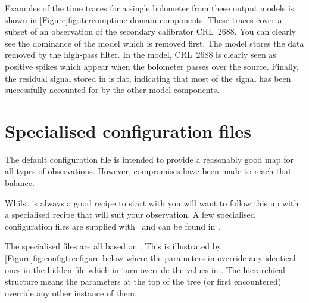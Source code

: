 \documentclass[11pt,oneside,chapters]{starlink}
\begin{document}

Examples of the time traces for a single bolometer from these output
models is shown in \cref{Figure}{fig:itercomp}{time-domain
components}. These traces cover a subset of an observation of the
secondary calibrator CRL~2688. You can clearly see the dominance of the
 model which is removed first. The  model
stores the data removed by the high-pass filter. In the 
model, CRL~2688 is clearly seen as positive spikes which appear when
the bolometer passes over the source. Finally, the residual signal
stored in  is flat, indicating that most of the signal has
been successfully accounted for by the other model components.


\section{Specialised configuration files}
\label{sec:config}
The default configuration file  is intended to
provide a reasonably good map for all types of observations. However,
compromises have been made to reach that balance.

Whilst  is always a good recipe to start with
you will want to follow this up with a specialised recipe that will suit
your observation. A few specialised configuration files are supplied with
\smurf\ and can be found in .

The specialised files are all based on . This
is illustrated by \cref{Figure}{fig:configtree}{figure below} where
the parameters in  override
any identical ones in the hidden file  which in turn
override the values in . The hierarchical
structure means the parameters at the top of the tree (or first
encountered) override any other instance of them.

\end{document}
